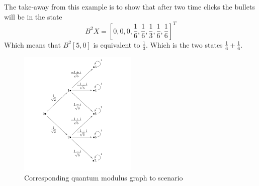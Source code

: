 \documentclass[12pt]{article}
\begin{document}
The take-away from this example is to show that after two time clicks the bullets will be in the state \[B^2X = [0,0,0,\frac{1}{6},\frac{1}{6},\frac{1}{3},\frac{1}{6},\frac{1}{6}]^T\]
Which means that \(B^2[5,0]\) is equivalent to \(\frac{1}{3}\). Which is the two states \(\frac{1}{6}+\frac{1}{6}\).\par
\clearpage
\begin{figure}[!h]
    \centering
    \includegraphics[width=0.5\textwidth]{quantumslit}
    \caption{Corresponding quantum modulus graph to scenario}
\end{figure}
\end{document}
